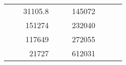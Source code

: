 \begin{table}[]
\begin{tabular}{|ccrccrccc}
\multicolumn{1}{|c|}{\cellcolor[HTML]{FFFFC7}}                                & \multicolumn{1}{c|}{\cellcolor[HTML]{DDFDFF}}                      & \multicolumn{1}{r|}{\cellcolor[HTML]{DAE8FC}31105.8}   & \multicolumn{1}{c|}{\cellcolor[HTML]{FFFFC7}}                                & \multicolumn{1}{c|}{\cellcolor[HTML]{DDFDFF}}                       & \multicolumn{1}{r|}{\cellcolor[HTML]{DDFDFF}145072}    &                                                                              &                                                                    &                                                        \\ \cline{3-3} \cline{6-6}
\multicolumn{1}{|c|}{\cellcolor[HTML]{FFFFC7}}                                & \multicolumn{1}{c|}{\cellcolor[HTML]{DDFDFF}}                      & \multicolumn{1}{r|}{\cellcolor[HTML]{DDFDFF}151274}    & \multicolumn{1}{c|}{\cellcolor[HTML]{FFFFC7}}                                & \multicolumn{1}{c|}{\cellcolor[HTML]{DDFDFF}}                       & \multicolumn{1}{r|}{\cellcolor[HTML]{DAE8FC}232040}    &                                                                              &                                                                    &                                                        \\ \cline{3-3} \cline{6-6}
\multicolumn{1}{|c|}{\cellcolor[HTML]{FFFFC7}}                                & \multicolumn{1}{c|}{\cellcolor[HTML]{DDFDFF}}                      & \multicolumn{1}{r|}{\cellcolor[HTML]{DAE8FC}117649}    & \multicolumn{1}{c|}{\cellcolor[HTML]{FFFFC7}}                                & \multicolumn{1}{c|}{\cellcolor[HTML]{DDFDFF}}                       & \multicolumn{1}{r|}{\cellcolor[HTML]{DDFDFF}272055}    &                                                                              &                                                                    &                                                        \\ \cline{3-3} \cline{6-6}
\multicolumn{1}{|c|}{\cellcolor[HTML]{FFFFC7}}                                & \multicolumn{1}{c|}{\cellcolor[HTML]{DDFDFF}}                      & \multicolumn{1}{r|}{\cellcolor[HTML]{DDFDFF}21727}     & \multicolumn{1}{c|}{\cellcolor[HTML]{FFFFC7}}                                & \multicolumn{1}{c|}{\cellcolor[HTML]{DDFDFF}}                       & \multicolumn{1}{r|}{\cellcolor[HTML]{DAE8FC}612031}    &                                                                              &                                                                    &                                                        \\ \cline{3-3} \cline{6-6}

\end{tabular}
\end{table}
